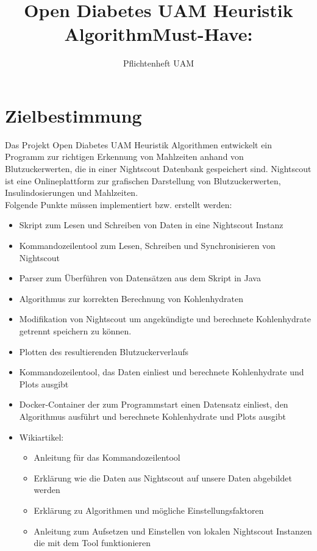 \documentclass[accentcolor=tud0b,12pt,paper=a4]{tudreport}
\title{Open Diabetes UAM Heuristik Algorithm}
\subtitle{Pflichtenheft UAM}
\begin{document}
	\maketitle
	\tableofcontents 
	\newpage
	\chapter{Zielbestimmung}
	
	Das Projekt Open Diabetes UAM Heuristik Algorithmen entwickelt ein Programm zur richtigen Erkennung von Mahlzeiten anhand von Blutzuckerwerten, die in einer Nightscout Datenbank gespeichert sind. 
	Nightscout ist eine Onlineplattform zur grafischen Darstellung von Blutzuckerwerten, Insulindosierungen und Mahlzeiten. \\

Folgende Punkte müssen implementiert bzw. erstellt werden:\\

\title{\textbf{Must-Have:}}
\begin{itemize}
	\item Skript zum Lesen und Schreiben von Daten in eine Nightscout Instanz	
	\item Kommandozeilentool zum Lesen, Schreiben und Synchronisieren von Nightscout
	\item Parser zum Überführen von Datensätzen aus dem Skript in Java
	\item Algorithmus zur korrekten Berechnung von Kohlenhydraten
	\item Modifikation von Nightscout um angekündigte und berechnete Kohlenhydrate getrennt speichern  zu können.      %
	\item Plotten des resultierenden Blutzuckerverlaufs 
	\item Kommandozeilentool, das Daten einliest und berechnete Kohlenhydrate und Plots ausgibt
	\item Docker-Container der zum Programmstart einen Datensatz einliest, den Algorithmus ausführt und berechnete Kohlenhydrate und Plots ausgibt

	\item Wikiartikel:
	\begin{itemize}
	\item Anleitung für das Kommandozeilentool
	\item Erklärung wie die Daten aus Nightscout auf unsere Daten abgebildet werden
	\item Erklärung zu Algorithmen und mögliche Einstellungsfaktoren
	\item Anleitung zum Aufsetzen und Einstellen von lokalen Nightscout Instanzen die mit dem Tool funktionieren
	\end{itemize}

\end{itemize}
\end{document}
